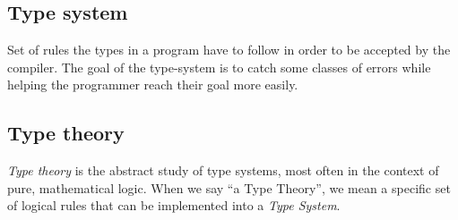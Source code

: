 \documentclass[
]{article}
\begin{document}
\hypertarget{type-system-1}{%
\subsection{Type system}\label{type-system-1}}

Set of rules the types in a program have to follow in order to be
accepted by the compiler. The goal of the type-system is to catch some
classes of errors while helping the programmer reach their goal more
easily.

\hypertarget{type-theory}{%
\subsection{Type theory}\label{type-theory}}

\emph{Type theory} is the abstract study of type systems, most often in
the context of pure, mathematical logic. When we say ``a Type Theory'',
we mean a specific set of logical rules that can be implemented into a
\emph{Type System}.

 

\end{document}
